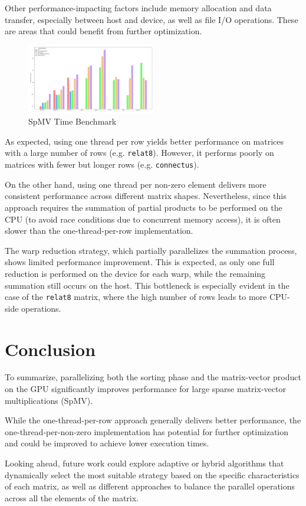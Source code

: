 \documentclass[conference]{IEEEtran}
\begin{document}
    Other performance-impacting factors include memory allocation and data
    transfer, especially between host and device, as well as file I/O
    operations.
    These are areas that could benefit from further optimization.

    \begin{figure}[ht]
        \caption{SpMV Time Benchmark}
        \centering
        \includegraphics[width=0.5\textwidth]{spmv-benchmark.png}
    \end{figure}

    As expected, using one thread per row yields better performance on matrices
    with a large number of rows (e.g. \texttt{relat8}).
    However, it performs poorly on matrices with fewer but longer rows (e.g.
    \texttt{connectus}).

    On the other hand, using one thread per non-zero element delivers more
    consistent performance across different matrix shapes.
    Nevertheless, since this approach requires the summation of partial
    products to be performed on the CPU (to avoid race conditions due to
    concurrent memory access), it is often slower than the one-thread-per-row
    implementation.

    The warp reduction strategy, which partially parallelizes the summation
    process, shows limited performance improvement.
    This is expected, as only one full reduction is performed on the device for
    each warp, while the remaining summation still occurs on the host.
    This bottleneck is especially evident in the case of the \texttt{relat8}
    matrix, where the high number of rows leads to more CPU-side operations.

    \section{Conclusion}

    To summarize, parallelizing both the sorting phase and the matrix-vector
    product on the GPU significantly improves performance for large sparse
    matrix-vector multiplications (SpMV).

    While the one-thread-per-row approach generally delivers better performance,
    the one-thread-per-non-zero implementation has potential for further
    optimization and could be improved to achieve lower execution times.

    Looking ahead, future work could explore adaptive or hybrid algorithms that
    dynamically select the most suitable strategy based on the specific
    characteristics of each matrix, as well as different approaches to balance
    the parallel operations across all the elements of the matrix.

    
    
\end{document}
